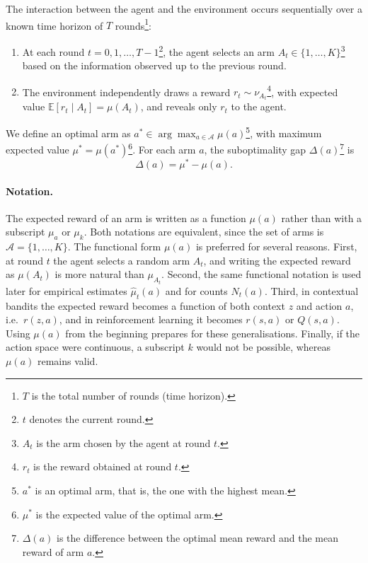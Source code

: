 The interaction between the agent and the environment occurs sequentially over a known time horizon of \(T\) rounds\footnote{\(T\) is the total number of rounds (time horizon).}:
\begin{enumerate}
    \item At each round \(t = 0, 1, \dots, T-1\)\footnote{\(t\) denotes the current round.}, the agent selects an arm \(A_t \in \{1, \dots, K\}\)\footnote{\(A_t\) is the arm chosen by the agent at round \(t\).} based on the information observed up to the previous round.
    \item The environment independently draws a reward \(r_t \sim \nu_{A_t}\)\footnote{\(r_t\) is the reward obtained at round \(t\).}, with expected value \(\mathbb{E}[r_t \mid A_t] = \mu(A_t)\), and reveals only \(r_t\) to the agent.
\end{enumerate}
We define an optimal arm as \(a^* \in \arg\max_{a \in \mathcal{A}} \mu(a)\)\footnote{\(a^*\) is an optimal arm, that is, the one with the highest mean.}, with maximum expected value \(\mu^* = \mu(a^*)\)\footnote{\(\mu^*\) is the expected value of the optimal arm.}. For each arm \(a\), the suboptimality gap \(\Delta(a)\)\footnote{\(\Delta(a)\) is the difference between the optimal mean reward and the mean reward of arm \(a\).} is
\begin{equation}
    \Delta(a) = \mu^* - \mu(a).
\end{equation}

\paragraph{Notation.} The expected reward of an arm is written as a function \(\mu(a)\) rather than with a subscript \(\mu_a\) or \(\mu_k\). Both notations are equivalent, since the set of arms is \(\mathcal{A} = \{1,\dots,K\}\). The functional form \(\mu(a)\) is preferred for several reasons. First, at round \(t\) the agent selects a random arm \(A_t\), and writing the expected reward as \(\mu(A_t)\) is more natural than \(\mu_{A_t}\). Second, the same functional notation is used later for empirical estimates \(\hat{\mu}_t(a)\) and for counts \(N_t(a)\). Third, in contextual bandits the expected reward becomes a function of both context \(z\) and action \(a\), i.e.\ \(r(z,a)\), and in reinforcement learning it becomes \(r(s,a)\) or \(Q(s,a)\). Using \(\mu(a)\) from the beginning prepares for these generalisations. Finally, if the action space were continuous, a subscript \(k\) would not be possible, whereas \(\mu(a)\) remains valid.

